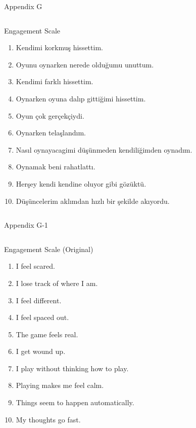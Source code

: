 \documentclass{beamer}
\begin{document}
\begin{frame}[label=appG, plain]{Appendix G}
 \fontsize{10pt}{10}\selectfont
  \begin{columns}[t]
    \begin{exampleblock}{Engagement Scale}

\begin{enumerate}
\item Kendimi korkmuş hissettim.
\item Oyunu oynarken nerede olduğumu unuttum.
\item Kendimi farklı hissettim.
\item Oynarken oyuna dalıp gittiğimi hissettim.
\item Oyun çok gerçekçiydi.
\item Oynarken telaşlandım.
\item Nasıl oynayacagimi düşünmeden kendiliğimden oynadım.
\item Oynamak beni rahatlattı.
\item Herşey kendi kendine oluyor gibi gözüktü.
\item Düşüncelerim aklımdan hızlı bir şekilde akıyordu.
\end{enumerate}

    \end{exampleblock}
  \end{columns}  
\end{frame}

\begin{frame}[label=appG1, plain]{Appendix G-1}
 \fontsize{10pt}{10}\selectfont
  \begin{columns}[t]
    \begin{exampleblock}{Engagement Scale (Original) \cite{Brockmyer2009GEQ}}

\begin{enumerate}
\item I feel scared.
\item I lose track of where I am.
\item I feel different. 
\item I feel spaced out.
\item The game feels real.
\item I get wound up.
\item I play without thinking how to play.
\item Playing makes me feel calm.
\item Things seem to happen automatically.
\item My thoughts go fast.
\end{enumerate}

    \end{exampleblock}
  \end{columns}  
\end{frame}
\end{document}
